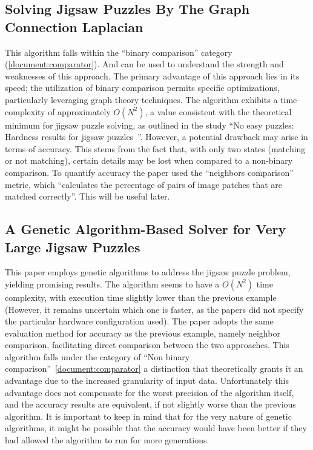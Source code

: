 \documentclass[epsfig,a4paper,11pt,titlepage,twoside,openany]{article}
\begin{document}
\subsection{Solving Jigsaw Puzzles By The Graph Connection Laplacian~\cite{GCL}}
This algorithm falls within the ``binary comparison'' category (\cref{document:comparator}).
And can be used to understand the strength and weaknesses
of this approach.\newline
The primary advantage of this approach lies in its speed;
the utilization of binary comparison permits specific optimizations,
particularly leveraging graph theory techniques.\newline
The algorithm exhibits a time complexity of approximately \(O(N^2)\),
a value consistent with the theoretical minimum for
jigsaw puzzle solving, as outlined in the study
``No easy puzzles: Hardness results for jigsaw puzzles~\cite{ON2Claim}''.\newline
However, a potential drawback may arise in terms of accuracy.
This stems from the fact that, with only two states
(matching or not matching),
certain details may be lost when compared to a non-binary comparison. 
To quantify accuracy the paper used the ``neighbors comparison'' metric,
which ``calculates the percentage of pairs of image patches that are matched correctly''.
This will be useful later.\label{document:GCL}

\subsection{A Genetic Algorithm-Based Solver for Very Large Jigsaw Puzzles~\cite{GA}}
This paper employs genetic algorithms to address the
jigsaw puzzle problem, yielding promising results.\newline
The algorithm seems to have a \(O(N^2)\) time complexity,
with execution time slightly lower than the previous example
(However, it remains uncertain which one is faster, as the papers did not specify
the particular hardware configuration used).\newline
The paper adopts the same evaluation method for accuracy as the previous example,
namely neighbor comparison, facilitating direct comparison between the two approaches.
This algorithm falls under the category of “Non binary comparison”~\cref{document:comparator}
a distinction that theoretically grants it an advantage due to the increased granularity
of input data.
Unfortunately this advantage does not compensate for the worst precision
of the algorithm itself, and the accuracy results are equivalent,
if not slightly worse than the previous algorithm.\newline
It is important to keep in mind that for the very nature of genetic algorithms,
it might be possible that the accuracy would have been better if they had allowed
the algorithm to run for more generations.\label{document:GA}
\end{document}
